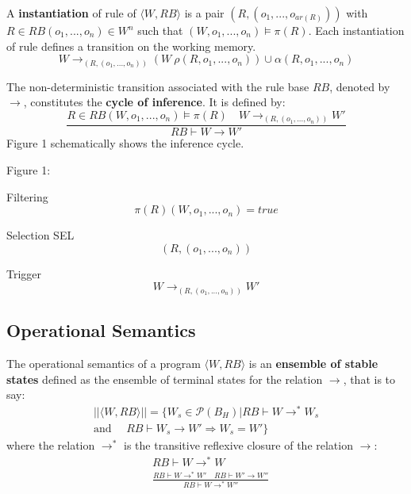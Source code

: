 A \textbf{instantiation} of rule of $\langle W, RB \rangle$ is a pair $(R, (o_1, ..., o_{ar(R)}))$ with
$R \in RB(o_1, ..., o_n) \in W^n$ such that $(W, o_1, ..., o_n) \vDash \pi(R)$.  Each instantiation of rule
defines a transition on the working memory.
\begin{equation}
W \rightarrow_{(R, (o_1, ... , o_n))} (W \ \rho(R, o_1, ..., o_n)) \cup \alpha(R, o_1, ..., o_n)
\nonumber
\end{equation}

The non-deterministic transition associated with the rule base $RB$, denoted by $\rightarrow$,
constitutes the \textbf{cycle of inference}. It is defined by:
\begin{equation}
\frac{R \in RB (W, o_1, ..., o_n) \vDash \pi(R) \quad W \rightarrow_{(R, (o_1, ..., o_n))} W'}
{RB \vdash W \rightarrow W'}
\end{equation}
Figure 1 schematically shows the inference cycle.

Figure 1:

Filtering
\begin{equation}
\pi(R)(W, o_1, ..., o_n) = true
\nonumber
\end{equation}

Selection SEL
\begin{equation}
(R, (o_1, ..., o_n))
\nonumber
\end{equation}

Trigger
\begin{equation}
W \rightarrow_{(R, (o_1, ..., o_n))} W'
\nonumber
\end{equation}

\subsection{Operational Semantics}

The operational semantics of a program $\langle W, RB \rangle$ is an \textbf{ensemble of stable states}
defined as the ensemble of terminal states for the relation $\rightarrow$, that is to say:
\begin{eqnarray}
|| \langle W, RB \rangle || = \{ W_s \in \mathcal{P} (B_H) | RB \vdash W \rightarrow^* W_s \nonumber \\
\mbox{and } \quad RB \vdash W_s \rightarrow W' \Rightarrow W_s = W' \} \nonumber
\end{eqnarray}
where the relation $\rightarrow^*$ is the transitive reflexive closure of the relation $\rightarrow$:
\begin{eqnarray}
& RB \vdash W \rightarrow^* W \nonumber \\
& \displaystyle \frac{RB \vdash W \rightarrow^* W' \quad RB \vdash W' \rightarrow W''}
{RB \vdash W \rightarrow^* W''} \nonumber
\end{eqnarray}

